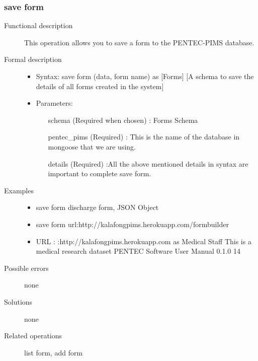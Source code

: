 \documentclass[a4paper]{article}
\begin{document}
	      
\subsubsection{save form}
\begin{description}
\item[Functional description] This operation allows you to save a form to the PENTEC-PIMS database.
\item [Formal description]\hfill
\begin{itemize}
	\item Syntax: save form (data, form name) as [Forms] [A schema to save the details of all forms created in the system]\\
	\item Parameters:
	\begin{itemize}
		\item [schema] (Required when chosen) : Forms Schema
		\item [pentec\_pims] (Required) : This is the name of the database in mongoose that we are using.
		\item [details] (Required) :All the above mentioned details in syntax are important to complete save form.
	\end{itemize}
\end{itemize}

\item[Examples]\hfill
\begin{itemize}
	\item save form discharge form, JSON Object
	\item save form url:http://kalafongpims.herokuapp.com/formbuilder
	\item URL : :http://kalafongpims.herokuapp.com as Medical Staff This is a medical research dataset
	PENTEC Software User Manual 0.1.0 14
\end{itemize}

\item[Possible errors]none
\item[Solutions] none
\item [Related operations] list form, add form
\end{description}
\end{document}
